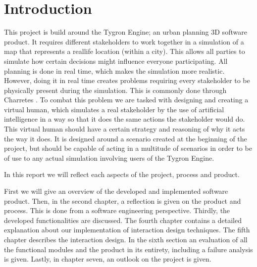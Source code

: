 \section{Introduction}

This project is build around the Tygron Engine; an urban planning 3D software product. It requires different stakeholders to work together in a simulation of a map that represents a reallife location (within a city). This allows all parties to simulate how certain decisions might influence everyone participating. All planning is done in real time, which makes the simulation more realistic. However, doing it in real time creates problems requiring every stakeholder to be physically present during the simulation. This is commonly done through Charretes \cite{Todd13}. To combat this problem we are tasked with designing and creating a virtual human, which simulates a real stakeholder by the use of artificial intelligence in a way so that it does the same actions the stakeholder would do. This virtual human should have a certain strategy and reasoning of why it acts the way it does. It is designed around a scenario created at the beginning of the project, but should be capable of acting in a multitude of scenarios in order to be of use to any actual simulation involving users of the Tygron Engine.

In this report we will reflect each aspects of the project, process and product.

First we will give an overview of the developed and implemented software product. Then, in the second chapter, a reflection is given on the product and process. This is done from a software engineering perspective. Thirdly, the developed functionalities are discussed. The fourth chapter contains a detailed explanation about our implementation of interaction design techniques. The fifth chapter describes the interaction design. In the sixth section an evaluation of all the functional modules and the product in its entirety, including a failure analysis is given. Lastly, in chapter seven, an outlook on the project is given.
\newpage

